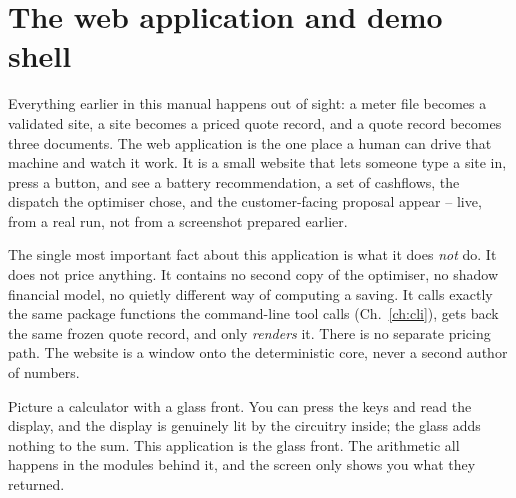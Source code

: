 \chapter{The web application and demo shell}
\label{ch:app}


Everything earlier in this manual happens out of sight: a meter file becomes a validated site, a site becomes a priced quote record, and a quote record becomes three documents. The web application is the one place a human can drive that machine and watch it work. It is a small website that lets someone type a site in, press a button, and see a battery recommendation, a set of cashflows, the dispatch the optimiser chose, and the customer-facing proposal appear -- live, from a real run, not from a screenshot prepared earlier.

The single most important fact about this application is what it does \emph{not} do. It does not price anything. It contains no second copy of the optimiser, no shadow financial model, no quietly different way of computing a saving. It calls exactly the same package functions the command-line tool calls (Ch.~\ref{ch:cli}), gets back the same frozen quote record, and only \emph{renders} it. There is no separate pricing path. The website is a window onto the deterministic core, never a second author of numbers.

\begin{plainnote}
Picture a calculator with a glass front. You can press the keys and read the display, and the display is genuinely lit by the circuitry inside; the glass adds nothing to the sum. This application is the glass front. The arithmetic all happens in the modules behind it, and the screen only shows you what they returned.
\end{plainnote}


